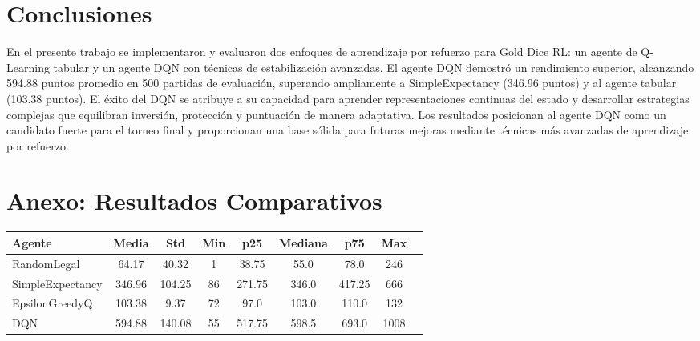 \documentclass[12pt,a4paper]{article}
\begin{document}
\section{Conclusiones}

En el presente trabajo se implementaron y evaluaron dos enfoques de aprendizaje por refuerzo para Gold Dice RL: un agente de Q-Learning tabular y un agente DQN con técnicas de estabilización avanzadas. El agente DQN demostró un rendimiento superior, alcanzando 594.88 puntos promedio en 500 partidas de evaluación, superando ampliamente a SimpleExpectancy (346.96 puntos) y al agente tabular (103.38 puntos). El éxito del DQN se atribuye a su capacidad para aprender representaciones continuas del estado y desarrollar estrategias complejas que equilibran inversión, protección y puntuación de manera adaptativa. Los resultados posicionan al agente DQN como un candidato fuerte para el torneo final y proporcionan una base sólida para futuras mejoras mediante técnicas más avanzadas de aprendizaje por refuerzo.

\section*{Anexo: Resultados Comparativos}

\begin{center}
	\begin{tabular}{lcccccccc}
		\toprule
		\textbf{Agente}  & \textbf{Media} & \textbf{Std} & \textbf{Min} & \textbf{p25} & \textbf{Mediana} & \textbf{p75} & \textbf{Max} \\
		\midrule
		RandomLegal      & 64.17          & 40.32        & 1            & 38.75        & 55.0             & 78.0         & 246          \\
		SimpleExpectancy & 346.96         & 104.25       & 86           & 271.75       & 346.0            & 417.25       & 666          \\
		EpsilonGreedyQ   & 103.38         & 9.37         & 72           & 97.0         & 103.0            & 110.0        & 132          \\
		DQN              & 594.88         & 140.08       & 55           & 517.75       & 598.5            & 693.0        & 1008         \\
		\bottomrule
	\end{tabular}
\end{center}
\end{document}
